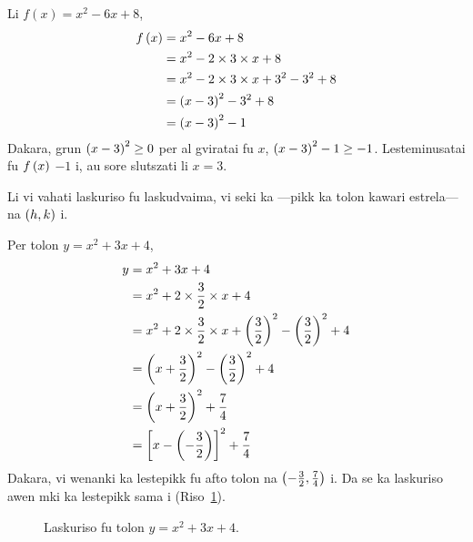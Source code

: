 \begin{example}
	Li \(f\left(x\right) = x^2 - 6x + 8\),
	\begin{align*}
		f\left(x\right) & = x^2 - 6x + 8                              \\
		        & = x^2 - 2 \times 3 \times x + 8             \\
		        & = x^2 - 2 \times 3 \times x + 3^2 - 3^2 + 8 \\
		        & = {\left(x - 3\right)}^2 - 3^2 + 8                  \\
		        & = {\left(x - 3\right)}^2 - 1
	\end{align*}
	Dakara, grun \({\left(x - 3\right)}^2 \geq 0\) per al gviratai fu \(x\),
	\({\left(x - 3\right)}^2 - 1 \geq - 1\). Lesteminusatai fu \(f\left(x\right)\) \(-1\) i,
	au sore slutszati li \(x = 3\).
\end{example}

Li vi vahati laskuriso fu laskudvaima, vi seki ka ---pikk
ka tolon kawari estrela---na \(\left(h, k\right)\) i.

\begin{example}
	Per tolon \(y = x^2 + 3x + 4\),
	\begin{align*}
		y & = x^2 + 3x + 4                                                                          \\
		  & = x^2 + 2 \times \frac{3}{2} \times x + 4                                               \\
		  & = x^2 + 2 \times \frac{3}{2} \times x + {\left(\frac{3}{2}\right)}^2 - {\left(\frac{3}{2}\right)}^2 + 4 \\
		  & = {\left(x + \frac{3}{2}\right)}^2 - {\left(\frac{3}{2}\right)}^2 + 4                                   \\
		  & = {\left(x + \frac{3}{2}\right)}^2 + \frac{7}{4}                                                \\
		  & = {\left[x - \left(- \frac{3}{2}\right)\right]}^2 + \frac{7}{4}
	\end{align*}
	Dakara, vi wenanki ka lestepikk fu afto tolon na \(\left(-\frac{3}{2}, \frac{7}{4}\right)\) i. Da se ka
	laskuriso awen mki ka lestepikk sama i (Riso~\ref{fig:tolon134}).
\end{example}

\begin{figure}[htpb]
	\centering
	\caption{Laskuriso fu tolon \(y = x^2 + 3x + 4\).}
	\label{fig:tolon134}
\end{figure}

